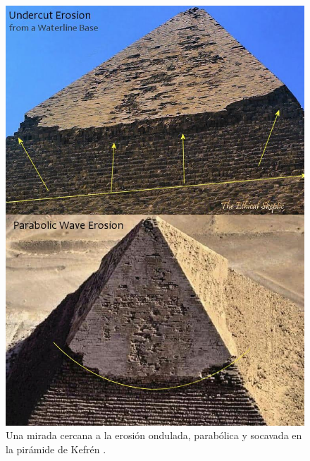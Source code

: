 \documentclass[10pt,twocolumn,letterpaper]{article}
\begin{document}
\begin{figure}[H]
\begin{center}
   \includegraphics[width=1\linewidth]{wave.jpg}
\end{center}
   \caption{Una mirada cercana a la erosión ondulada, parabólica y socavada en la pirámide de Kefrén \cite{27}.}
\label{fig:19}
\label{fig:onecol}
\end{figure}
\end{document}
